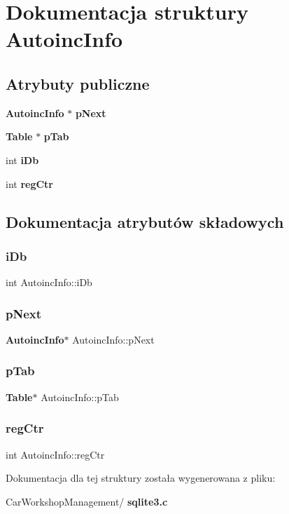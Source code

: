 \section{Dokumentacja struktury Autoinc\+Info}
\label{struct_autoinc_info}
\subsection*{Atrybuty publiczne}
\begin{DoxyCompactItemize}
\item 
\textbf{ Autoinc\+Info} $\ast$ \textbf{ p\+Next}
\item 
\textbf{ Table} $\ast$ \textbf{ p\+Tab}
\item 
int \textbf{ i\+Db}
\item 
int \textbf{ reg\+Ctr}
\end{DoxyCompactItemize}


\subsection{Dokumentacja atrybutów składowych}
\mbox{\label{struct_autoinc_info_ae7234e0916b11ef97377bdfd6c7c4568}} 
\subsubsection{iDb}
{\footnotesize\ttfamily int Autoinc\+Info\+::i\+Db}

\mbox{\label{struct_autoinc_info_aa77fb076beea013c25df4e49dba4b6f6}} 
\subsubsection{pNext}
{\footnotesize\ttfamily \textbf{ Autoinc\+Info}$\ast$ Autoinc\+Info\+::p\+Next}

\mbox{\label{struct_autoinc_info_a0cf785b0cbaddb4215a8408f8e13075e}} 
\subsubsection{pTab}
{\footnotesize\ttfamily \textbf{ Table}$\ast$ Autoinc\+Info\+::p\+Tab}

\mbox{\label{struct_autoinc_info_af180977ee7dcc8cab862185692f57cc5}} 
\subsubsection{regCtr}
{\footnotesize\ttfamily int Autoinc\+Info\+::reg\+Ctr}



Dokumentacja dla tej struktury została wygenerowana z pliku\+:\begin{DoxyCompactItemize}
\item 
Car\+Workshop\+Management/\textbf{ sqlite3.\+c}\end{DoxyCompactItemize}
